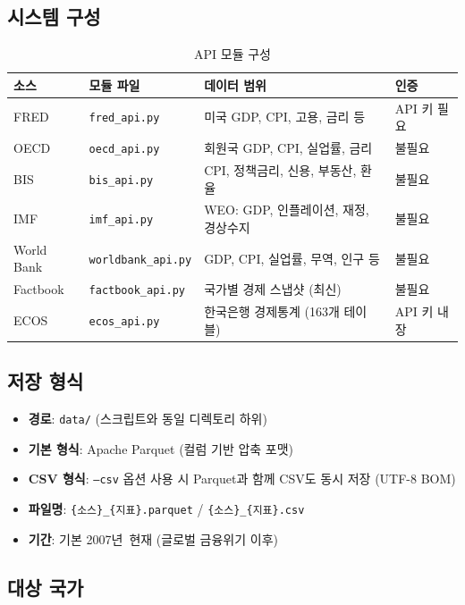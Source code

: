 \documentclass[11pt,a4paper]{article}
\newcommand{\code}[1]{\texttt{#1}}
\newcommand{\file}[1]{\texttt{\textcolor{string}{#1}}}
\begin{document}
\subsection{시스템 구성}

\begin{table}[h]
\centering
\caption{API 모듈 구성}
\begin{tabularx}{\textwidth}{l l X l}
\toprule
\textbf{소스} & \textbf{모듈 파일} & \textbf{데이터 범위} & \textbf{인증} \\
\midrule
FRED     & \file{fred\_api.py}      & 미국 GDP, CPI, 고용, 금리 등      & API 키 필요 \\
OECD     & \file{oecd\_api.py}      & 회원국 GDP, CPI, 실업률, 금리      & 불필요 \\
BIS      & \file{bis\_api.py}       & CPI, 정책금리, 신용, 부동산, 환율   & 불필요 \\
IMF      & \file{imf\_api.py}       & WEO: GDP, 인플레이션, 재정, 경상수지 & 불필요 \\
World Bank & \file{worldbank\_api.py} & GDP, CPI, 실업률, 무역, 인구 등    & 불필요 \\
Factbook & \file{factbook\_api.py}  & 국가별 경제 스냅샷 (최신)           & 불필요 \\
ECOS     & \file{ecos\_api.py}      & 한국은행 경제통계 (163개 테이블)     & API 키 내장 \\
\bottomrule
\end{tabularx}
\end{table}

\subsection{저장 형식}

\begin{itemize}[leftmargin=2em]
    \item \textbf{경로}: \code{data/} (스크립트와 동일 디렉토리 하위)
    \item \textbf{기본 형식}: Apache Parquet (컬럼 기반 압축 포맷)
    \item \textbf{CSV 형식}: \code{--csv} 옵션 사용 시 Parquet과 함께 CSV도 동시 저장 (UTF-8 BOM)
    \item \textbf{파일명}: \code{\{소스\}\_\{지표\}.parquet} / \code{\{소스\}\_\{지표\}.csv}
    \item \textbf{기간}: 기본 2007년~현재 (글로벌 금융위기 이후)
\end{itemize}

\subsection{대상 국가}
\end{document}
